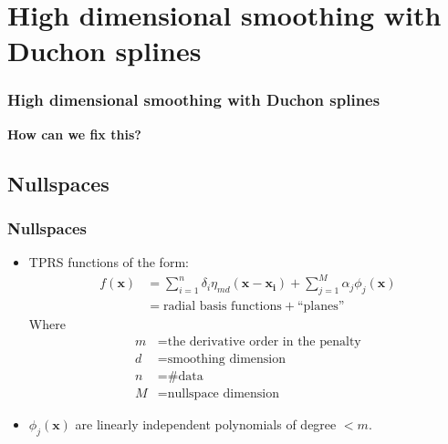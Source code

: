 \documentclass[ignorenonframetext]{beamer} %
\newcommand{\bc}{\begin{center}}
\newcommand{\ec}{\end{center}}
\newcommand{\bi}{\begin{itemize}}
\newcommand{\ei}{\end{itemize}}
\begin{document}


\section{High dimensional smoothing with Duchon splines}

\begin{frame}
	\frametitle{High dimensional smoothing with Duchon splines}
	\bc \textbf{How can we fix this?}\ec
\end{frame}

\subsection{Nullspaces}

\begin{frame}
	\frametitle{Nullspaces}
	\bi
		\item TPRS functions of the form:
		\begin{align*}
		f(\mathbf{x}) &= \sum_{i=1}^n \delta_i \eta_{md}(\mathbf{x}-\mathbf{x_i}) + \sum_{j=1}^M \alpha_j \phi_j(\mathbf{x})\\
		&= \text{radial basis functions} + \text{``planes''}
		\end{align*}
		Where \begin{align*}
				m &= \text{the derivative order in the penalty}\\
				d &= \text{smoothing dimension}\\
				n &= \text{\# data}\\
				M &= \text{nullspace dimension}
		\end{align*}
		\item $\phi_j(\mathbf{x})$ are linearly independent polynomials of degree $< m$.
	\ei
\end{frame}
\end{document}
